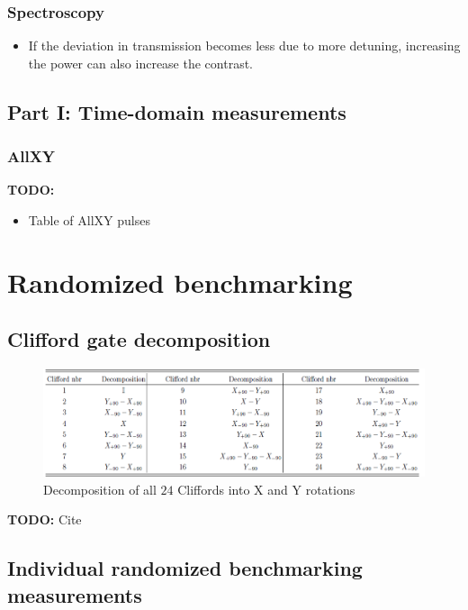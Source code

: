     \subsubsection{Spectroscopy}
      \begin{itemize}
        \item If the deviation in transmission becomes less due to more detuning, increasing the power can also increase the contrast.
      \end{itemize}
  \subsection{Part I: Time-domain measurements}
    \subsubsection{AllXY}
      \label{ssec:AllXY}
      \textbf{TODO:}
      \begin{itemize}
        \item Table of AllXY pulses
      \end{itemize}
\section{Randomized benchmarking}
  \subsection{Clifford gate decomposition}
    \label{ssec:Clifford gate decomposition}

    \begin{figure}[tb]
      \centering
      \includegraphics[width=\textwidth]{../Figures/Clifford decomposition.png}
      \caption{Decomposition of all $24$ Cliffords into X and Y rotations}
      \label{fig:Clifford decomposition}
    \end{figure}
    \textbf{TODO:} Cite

  \subsection{Individual randomized benchmarking measurements}
    \label{ssec:Individual randomized benchmarking measurements}

